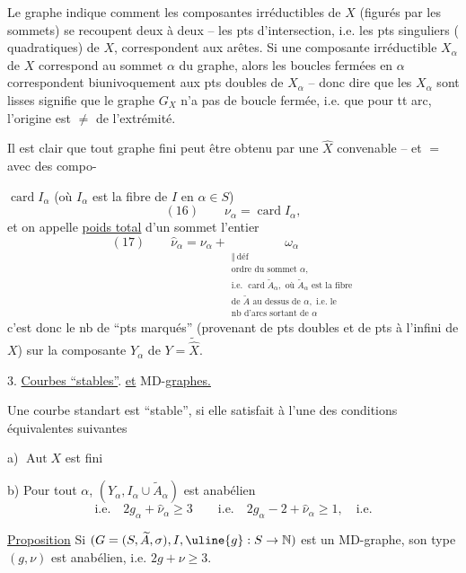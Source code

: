 Le graphe indique comment les composantes irréductibles de $X$ (figurés par les sommets) se recoupent deux à deux -- les pts d'intersection, i.e. les pts singuliers ( quadratiques) de $X$, correspondent aux arêtes. Si une composante irréductible $X_\alpha$ de $X$ correspond au sommet $\alpha$ du graphe, alors les boucles fermées en $\alpha$ correspondent biunivoquement aux pts doubles de $X_\alpha$ -- donc dire que les $X_\alpha$ sont lisses signifie que le graphe $G_X$ n'a pas de boucle fermée, i.e. que pour tt arc, l'origine est $\neq$ de l'extrémité.

Il est clair que tout graphe fini peut être obtenu   par une $\widehat X$ convenable -- et $=$ avec des compo-

$\operatorname{card}I_\alpha$ (où $I_\alpha$ est la fibre de $I$ en $\alpha\in S$)
\[
(16)\qquad\nu_\alpha=\operatorname{card}I_\alpha,
\]
et on appelle \uline{poids total} d'un sommet l'entier
\[
(17)\qquad\widehat\nu_\alpha=\nu_\alpha+
\underset{\substack{\Vert\ \mathrm{déf}\\
\text{ordre du sommet }\alpha,\\
\text{i.e. }\operatorname{card}\widetilde A_\alpha,\text{ où }\widetilde A_\alpha\text{ est la fibre}\\
\text{de }\widetilde A\text{ au dessus de }\alpha,\text{ i.e. le}\\
\text{nb d'arcs sortant de }\alpha}}{\omega_\alpha}
\]
c'est donc le nb de ``pts marqués'' (provenant de pts doubles et de pts à l'infini de $X$) sur la composante $Y_\alpha$ de $Y=\widetilde{\widehat X}$.

3. \uline{Courbes ``stables''}. \uline{et} MD-\uline{graphes.}

Une courbe standart  est ``stable'', si elle satisfait à l'une des conditions équivalentes suivantes

a) $\operatorname{Aut}X$ est fini

b) Pour tout $\alpha$, $(Y_\alpha,I_\alpha\cup\widetilde A_\alpha)$ est anabélien
\[
\text{i.e.}\quad 2g_\alpha+\widehat\nu_\alpha\geq3\qquad
\text{i.e.}\quad 2g_\alpha-2+\widehat\nu_\alpha\geq1,\quad\text{i.e.}
\]

\uline{Proposition} Si $(G=(S,\widetilde A,\sigma),I,\uline{g}:S\to\mathbb N)$ est un MD-graphe, son type $(g,\nu)$ est anabélien, i.e. $2g+\nu\geq3$.


